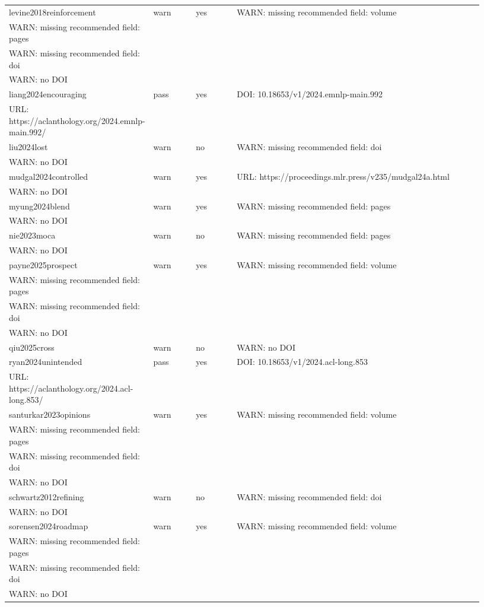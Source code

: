 \documentclass[11pt]{article}
\begin{document}
\begin{longtable}{p{0.18\linewidth}p{0.1\linewidth}p{0.1\linewidth}p{0.55\linewidth}}
levine2018reinforcement & warn & yes & WARN: missing recommended field: volume \\ WARN: missing recommended field: pages \\ WARN: missing recommended field: doi \\ WARN: no DOI \\
liang2024encouraging & pass & yes & DOI: 10.18653/v1/2024.emnlp-main.992 \\ URL: https://aclanthology.org/2024.emnlp-main.992/ \\
liu2024lost & warn & no & WARN: missing recommended field: doi \\ WARN: no DOI \\
mudgal2024controlled & warn & yes & URL: https://proceedings.mlr.press/v235/mudgal24a.html \\ WARN: no DOI \\
myung2024blend & warn & yes & WARN: missing recommended field: pages \\ WARN: no DOI \\
nie2023moca & warn & no & WARN: missing recommended field: pages \\ WARN: no DOI \\
payne2025prospect & warn & yes & WARN: missing recommended field: volume \\ WARN: missing recommended field: pages \\ WARN: missing recommended field: doi \\ WARN: no DOI \\
qiu2025cross & warn & no & WARN: no DOI \\
ryan2024unintended & pass & yes & DOI: 10.18653/v1/2024.acl-long.853 \\ URL: https://aclanthology.org/2024.acl-long.853/ \\
santurkar2023opinions & warn & yes & WARN: missing recommended field: volume \\ WARN: missing recommended field: pages \\ WARN: missing recommended field: doi \\ WARN: no DOI \\
schwartz2012refining & warn & no & WARN: missing recommended field: doi \\ WARN: no DOI \\
sorensen2024roadmap & warn & yes & WARN: missing recommended field: volume \\ WARN: missing recommended field: pages \\ WARN: missing recommended field: doi \\ WARN: no DOI \\

\end{longtable}
\end{document}
